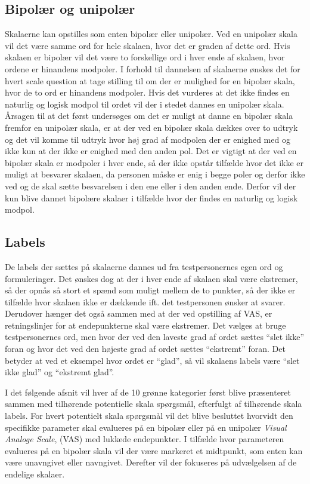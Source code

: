 \subsection{Bipolær og unipolær}
Skalaerne kan opstilles som enten bipolær eller unipolær. Ved en unipolær skala vil det være samme ord for hele skalaen, hvor det er graden af dette ord. Hvis skalaen er bipolær vil det være to forskellige ord i hver ende af skalaen, hvor ordene er hinandens modpoler. \blankline
%
I forhold til dannelsen af skalaerne ønskes det for hvert scale question at tage stilling til om der er mulighed for en bipolær skala, hvor de to ord er hinandens modpoler. Hvis det vurderes at det ikke findes en naturlig og logisk modpol til ordet vil der i stedet dannes en unipolær skala. \blankline
%
Årsagen til at det først undersøges om det er muligt at danne en bipolær skala fremfor en unipolær skala, er at der ved en bipolær skala dækkes over to udtryk og det vil komme til udtryk hvor høj grad af modpolen der er enighed med og ikke kun at der ikke er enighed med den anden pol. Det er vigtigt at der ved en bipolær skala er modpoler i hver ende, så der ikke opstår tilfælde hvor det ikke er muligt at besvarer skalaen, da personen måske er enig i begge poler og derfor ikke ved og de skal sætte besvarelsen i den ene eller i den anden ende. Derfor vil der kun blive dannet bipolære skalaer i tilfælde hvor der findes en naturlig og logisk modpol. 
%
\subsection{Labels}
%
De labels der sættes på skalaerne dannes ud fra testpersonernes egen ord og formuleringer. 
Det ønskes dog at der i hver ende af skalaen skal være ekstremer, så der opnås så stort et spænd som muligt mellem de to punkter, så der ikke er tilfælde hvor skalaen ikke er dækkende ift. det testpersonen ønsker at svarer. Derudover hænger det også sammen med at der ved opstilling af VAS, er retningslinjer for at endepunkterne skal være ekstremer.\blankline
%
Det vælges at bruge testpersonernes ord, men hvor der ved den laveste grad af ordet sættes ``slet ikke'' foran og hvor det ved den højeste grad af ordet sættes ``ekstremt'' foran. Det betyder at ved et eksempel hvor ordet er ``glad'', så vil skalaens labels være ``slet ikke glad'' og ``ekstremt glad''. \blankline

I det følgende afsnit vil hver af de 10 grønne kategorier først blive præsenteret sammen med tilhørende potentielle skala spørgsmål, efterfulgt af tilhørende skala labels. For hvert potentielt skala spørgsmål vil det blive besluttet hvorvidt den specifikke parameter skal evalueres på en bipolær eller på en unipolær \textit{Visual Analoge Scale}, (VAS) med lukkede endepunkter. I tilfælde hvor parameteren evalueres på en bipolær skala vil der være markeret et midtpunkt, som enten kan være unavngivet eller navngivet. Derefter vil der fokuseres på udvælgelsen af de endelige skalaer.